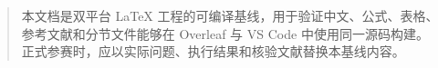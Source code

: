 \begin{abstract}
本文档是双平台 LaTeX 工程的可编译基线，用于验证中文、公式、表格、
参考文献和分节文件能够在 Overleaf 与 VS Code 中使用同一源码构建。
正式参赛时，应以实际问题、执行结果和核验文献替换本基线内容。

\end{abstract}
